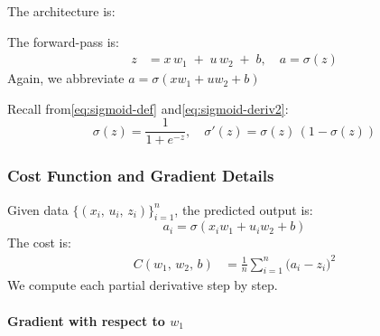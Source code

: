 \documentclass{article}
\begin{document}
\noindent The architecture is:

\begin{center}
\end{center}

\noindent The forward-pass is:
\begin{align}
    z 
    &= x\,w_1 \;+\; u\,w_2 \;+\; b, 
    \quad
    a = \sigma(z)
    \label{eq:two-input-forward}
\end{align}
\noindent Again, we abbreviate \(a = \sigma(x w_1 + u w_2 + b)\)

\vspace{0.5em}
\noindent Recall from\eqref{eq:sigmoid-def} and\eqref{eq:sigmoid-deriv2}:
\[
    \sigma(z) = \frac{1}{1 + e^{-z}}, 
    \quad
    \sigma'(z) = \sigma(z)\,(1 - \sigma(z))
\]

\subsubsection{Cost Function and Gradient Details}\label{sec:two-input-gradient}

\noindent Given data \({\{(x_i,\,u_i,\,z_i)\}}_{i=1}^n\), the predicted output is:
\[
    a_i = \sigma(x_i w_1 + u_i w_2 + b)
\]
The cost is:
\begin{align}
    C(w_1,\,w_2,\,b)
    &= \frac{1}{n} \sum_{i=1}^{n} {\bigl(a_i - z_i\bigr)}^2
    \label{eq:two-input-cost}
\end{align}
We compute each partial derivative step by step.

\paragraph{Gradient with respect to \(w_1\)\\}\label{sec:grad-w1-two-input}
\end{document}
